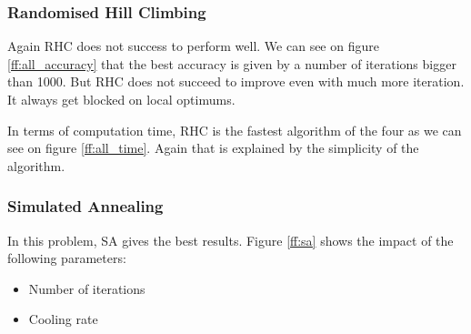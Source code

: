 \documentclass[twocolumn, 10pt]{article}
\begin{document}
			\subsubsection*{Randomised Hill Climbing}
				Again RHC does not success to perform well. We can see on figure \ref{ff:all_accuracy} that the best accuracy is given by a number of iterations bigger than 1000. But RHC does not succeed to improve even with much more iteration. It always get blocked on local optimums.

				In terms of computation time, RHC is the fastest algorithm of the four as we can see on figure \ref{ff:all_time}. Again that is explained by the simplicity of the algorithm.
			\subsubsection*{Simulated Annealing}
				In this problem, SA gives the best results. Figure \ref{ff:sa} shows the impact of the following parameters:
				\begin{itemize}
					\item Number of iterations
					\item Cooling rate
				\end{itemize}
\end{document}
